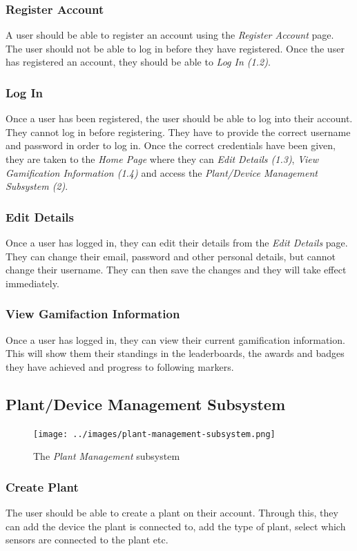 \documentclass{article}
\begin{document}
		\subsubsection{Register Account}
			A user should be able to register an account using the \emph{Register Account} page. The user should not be able to log in before they have registered. Once the user has registered an account, they should be able to \emph{Log In (1.2)}.
		\subsubsection{Log In}
			Once a user has been registered, the user should be able to log into their account. They cannot log in before registering. They have to provide the correct username and password in order to log in. Once the correct credentials have been given, they are taken to the \emph{Home Page} where they can \emph{Edit Details (1.3)}, \emph{View Gamification Information (1.4)} and access the \emph{Plant/Device Management Subsystem (2)}.
		\subsubsection{Edit Details}
			Once a user has logged in, they can edit their details from the \emph{Edit Details} page. They can change their email, password and other personal details, but cannot change their username. They can then save the changes and they will take effect immediately.
		\subsubsection{View Gamifaction Information}
			Once a user has logged in, they can view their current gamification information. This will show them their standings in the leaderboards, the awards and badges they have achieved and progress to following markers.
	
	\newpage
	\subsection{Plant/Device Management Subsystem}
		\begin{figure}[H]
			\centering
			\texttt{[image: ../images/plant-management-subsystem.png]}
			\caption{The \emph{Plant Management} subsystem}
		\end{figure}
		\subsubsection{Create Plant}
			The user should be able to create a plant on their account. Through this, they can add the device the plant is connected to, add the type of plant, select which sensors are connected to the plant etc.
\end{document}
